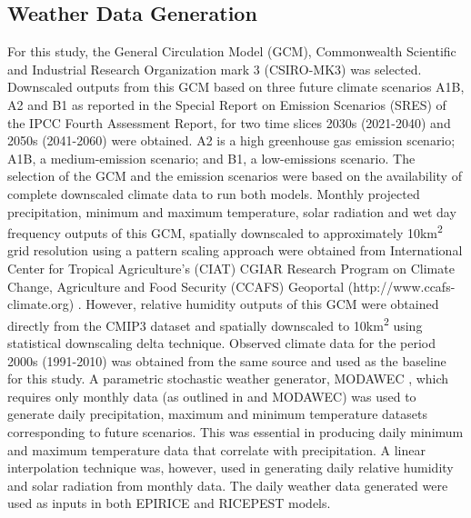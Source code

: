     \subsection{Weather Data Generation}
    \label{weather_data}
    For this study, the General Circulation Model (GCM), Commonwealth Scientific and Industrial Research Organization mark 3 (CSIRO-MK3) was selected. Downscaled outputs from this GCM based on three future climate scenarios A1B, A2 and B1 as reported in the Special Report on Emission Scenarios (SRES) of the IPCC Fourth Assessment Report, for two time slices 2030s (2021-2040) and 2050s (2041-2060) were obtained. A2 is a high greenhouse gas emission scenario; A1B, a medium-emission scenario; and B1, a low-emissions scenario. The selection of the GCM and the emission scenarios were based on the availability of complete downscaled climate data to run both models. Monthly projected precipitation, minimum and maximum temperature, solar radiation and wet day frequency outputs of this GCM, spatially downscaled to approximately 10km\textsuperscript{2} grid resolution using a pattern scaling approach were obtained from International Center for Tropical Agriculture's (CIAT) CGIAR Research Program on Climate Change, Agriculture and Food Security (CCAFS) Geoportal (http://www.ccafs-climate.org) \citep{Jones2009}. However, relative humidity outputs of this GCM were obtained directly from the CMIP3 dataset and spatially downscaled to 10km\textsuperscript{2} using statistical downscaling delta technique. Observed climate data for the period 2000s (1991-2010) was obtained from the same source and used as the baseline for this study. A parametric stochastic weather generator, MODAWEC \citep{Liu2009}, which requires only monthly data (as outlined in \citep{Geng1986} and MODAWEC) was used to generate daily precipitation, maximum and minimum temperature datasets corresponding to future scenarios. This was essential in producing daily minimum and maximum temperature data that correlate with precipitation. A linear interpolation technique was, however, used in generating daily relative humidity and solar radiation from monthly data. The daily weather data generated were used as inputs in both EPIRICE and RICEPEST models.
    
